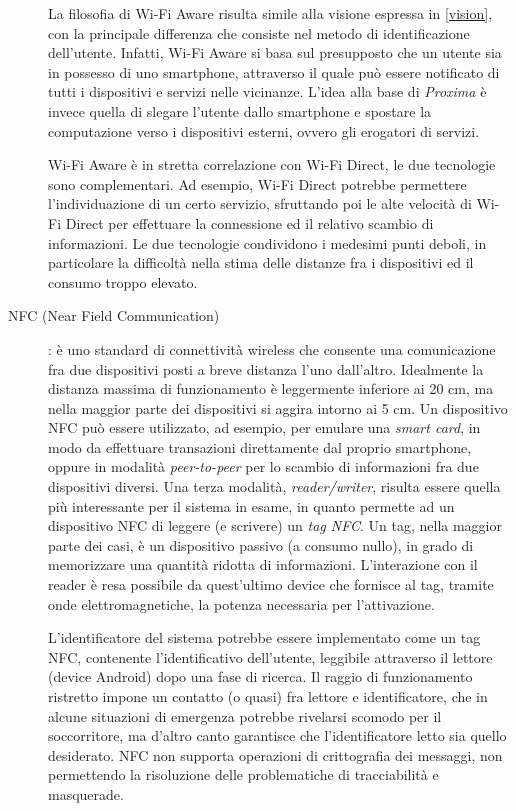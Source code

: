 \documentclass[a4paper,12pt]{report}
\begin{document}
\begin{description}
	La filosofia di Wi-Fi Aware risulta simile alla visione espressa in \autoref{vision}, con la principale differenza che consiste nel metodo di identificazione dell'utente. Infatti, Wi-Fi Aware si basa sul presupposto che un utente sia in possesso di uno smartphone, attraverso il quale può essere notificato di tutti i dispositivi e servizi nelle vicinanze. L'idea alla base di \emph{Proxima} è invece quella di slegare l'utente dallo smartphone e spostare la computazione verso i dispositivi esterni, ovvero gli erogatori di servizi. 
	
	Wi-Fi Aware è in stretta correlazione con Wi-Fi Direct, le due tecnologie sono complementari. Ad esempio, Wi-Fi Direct potrebbe permettere l'individuazione di un certo servizio, sfruttando poi le alte velocità di Wi-Fi Direct per effettuare la connessione ed il relativo scambio di informazioni. Le due tecnologie condividono i medesimi punti deboli, in particolare la difficoltà nella stima delle distanze fra i dispositivi ed il consumo troppo elevato.
	
	\item[NFC (Near Field Communication)] : è uno standard di connettività wireless che consente una comunicazione fra due dispositivi posti a breve distanza l'uno dall'altro. Idealmente la distanza massima di funzionamento è leggermente inferiore ai 20 cm, ma nella maggior parte dei dispositivi si aggira intorno ai 5 cm. Un dispositivo NFC può essere utilizzato, ad esempio, per emulare una \emph{smart card}, in modo da effettuare transazioni direttamente dal proprio smartphone, oppure in modalità \emph{peer-to-peer} per lo scambio di informazioni fra due dispositivi diversi. Una terza modalità, \emph{reader/writer}, risulta essere quella più interessante per il sistema in esame, in quanto permette ad un dispositivo NFC di leggere (e scrivere) un \emph{tag NFC}. Un tag, nella maggior parte dei casi, è un dispositivo passivo (a consumo nullo), in grado di memorizzare una quantità ridotta di informazioni. L'interazione con il reader è resa possibile da quest'ultimo device che fornisce al tag, tramite onde elettromagnetiche, la potenza necessaria per l'attivazione. 
	
	L'identificatore del sistema potrebbe essere implementato come un tag NFC, contenente l'identificativo dell'utente, leggibile attraverso il lettore (device Android) dopo una fase di ricerca. Il raggio di funzionamento ristretto impone un contatto (o quasi) fra lettore e identificatore, che in alcune situazioni di emergenza potrebbe rivelarsi scomodo per il soccorritore, ma d'altro canto garantisce che l'identificatore letto sia quello desiderato. NFC non supporta operazioni di crittografia dei messaggi, non permettendo la risoluzione delle problematiche di tracciabilità e masquerade.
	

\end{description}
\end{document}
